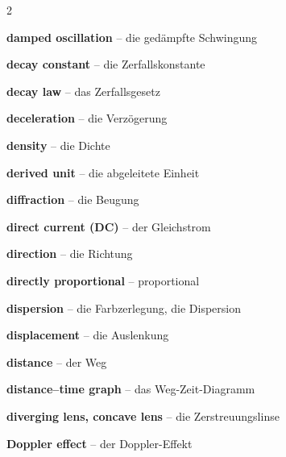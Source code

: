 \begin{multicols}{2}
\par\nopagebreak
\textbf{damped oscillation} -- die gedämpfte Schwingung\dotfill\hyperref[e:198]{\pageref*{e:198}}\par
\textbf{decay constant} -- die Zerfallskonstante\dotfill\hyperref[e:282]{\pageref*{e:282}}\par
\textbf{decay law} -- das Zerfallsgesetz\dotfill\hyperref[e:281]{\pageref*{e:281}}\par
\textbf{deceleration} -- die Verzögerung\dotfill\hyperref[e:41]{\pageref*{e:41}}\par
\textbf{density} -- die Dichte\dotfill\hyperref[e:58]{\pageref*{e:58}}\par
\textbf{derived unit} -- die abgeleitete Einheit\dotfill\hyperref[e:5]{\pageref*{e:5}}\par
\textbf{diffraction} -- die Beugung\dotfill\hyperref[e:208]{\pageref*{e:208}}\par
\textbf{direct current (DC)} -- der Gleichstrom\dotfill\hyperref[e:166]{\pageref*{e:166}}\par
\textbf{direction} -- die Richtung\dotfill\hyperref[e:62]{\pageref*{e:62}}\par
\textbf{directly proportional} -- proportional\dotfill\hyperref[e:25]{\pageref*{e:25}}\par
\textbf{dispersion} -- die Farbzerlegung, die Dispersion\dotfill\hyperref[e:256]{\pageref*{e:256}}\par
\textbf{displacement} -- die Auslenkung\dotfill\hyperref[e:194]{\pageref*{e:194}}\par
\textbf{distance} -- der Weg\dotfill\hyperref[e:35]{\pageref*{e:35}}\par
\textbf{distance–time graph} -- das Weg-Zeit-Diagramm\dotfill\hyperref[e:44]{\pageref*{e:44}}\par
\textbf{diverging lens, concave lens} -- die Zerstreuungslinse\dotfill\hyperref[e:242]{\pageref*{e:242}}\par
\textbf{Doppler effect} -- der Doppler-Effekt\dotfill\hyperref[e:219]{\pageref*{e:219}}\par


\end{multicols}
